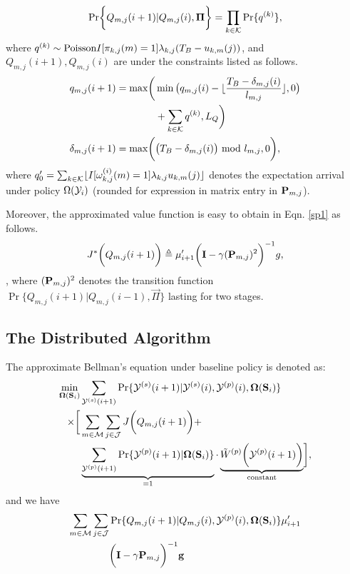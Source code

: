         \begin{align}
            \Pr \Brace{Q_{m,j}(i+1)|Q_{m,j}(i),\vec{\Pi}} = \prod_{k\in\apSet} \Pr\{q^{(k)}\},
        \end{align}
        where $q^{(k)} \sim \text{Poisson}{I[\pi_{k,j}(m)=1]\lambda_{k,j}(T_B-u_{k,m}(j))}$, and $Q_{m,j}(i+1), Q_{m,j}(i)$ are under the constraints listed as follows.
        \begin{align}
            q_{m,j}(i+1) = \max\Paren{
                &\min\big(q_{m,j}(i) - \lfloor{\frac{T_B-\delta_{m,j}(i)}{l_{m,j}}}\rfloor, 0\big)
                \nonumber\\
                &+\sum_{k\in\apSet} q^{(k)}, L_Q
            }
            \\
            \delta_{m,j}(i+1) = \max\Paren{
                &\big(T_B - \delta_{m,j}(i)\big) \text{ mod } l_{m,j}, 0
            },
        \end{align}
        where $q'_0 = \sum_{k\in\mathcal{K}} \lfloor{I[\omega^{(i)}_{k,j}(m)=1] \lambda_{k,j} u_{k,m}(j)}\rfloor$ denotes the expectation arrival under policy $\Omega(\mathcal{Y}_i)$ (rounded for expression in matrix entry in $\mathbf{P}_{m,j}$).
        
        Moreover, the approximated value function is easy to obtain in Eqn. \ref{sp1} as follows.
        \begin{align}
            J^{*}\bigg(Q_{m,j}(i+1)\bigg) \triangleq \mu'_{i+1} \bigg(\mathbf{I} - \gamma (\mathbf{P}_{m,j})^{2}\bigg)^{-1} g,
        \end{align},
        where $(\mathbf{P}_{m,j})^{2}$ denotes the transition function $\Pr\{Q_{m,j}(i+1)|Q_{m,j}(i-1), \vec{\Pi}\}$ lasting for two stages.

\subsection{The Distributed Algorithm}
The approximate Bellman's equation under baseline policy is denoted as:
\begin{align}
    \min_{\Policy(\Stat_i)}& \sum_{\Obsv^{(s)}(i+1)} \Pr\{\Obsv^{(s)}(i+1)|\Obsv^{(s)}(i), \Obsv^{(p)}(i), \Policy(\Stat_i)\}
    \nonumber\\
    \times \Bracket{
        & \sum_{m\in\esSet}\sum_{j\in\jSpace} J\Paren{Q_{m,j}(i+1)}
        +
        \nonumber\\
        & \underbrace{\sum_{\Obsv^{(p)}(i+1)} \Pr\{\Obsv^{(p)}(i+1)|\Policy(\Stat_i)\}}_{\text{=1}}
        \cdot \underbrace{\tilde{W}^{(p)} \Paren{\Obsv^{(p)}(i+1)}}_{\text{constant}}
    },
\end{align}
and we have
\begin{align}
    \sum_{m\in\mathcal{M}}\sum_{j\in\mathcal{J}} &\Pr\{Q_{m,j}(i+1)|Q_{m,j}(i), \mathcal{Y}^{(p)}(i), \boldsymbol{\Omega}(\mathbf{S}_i)\} \mu'_{i+1}
        \nonumber\\
        &\bigg( \mathbf{I}-\gamma\mathbf{P}_{m,j} \bigg)^{-1} \mathbf{g}
\end{align}

